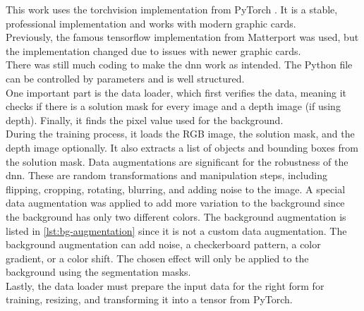 		This work uses the torchvision implementation from PyTorch \cite{Torchvision}. It is a stable, professional implementation and works with modern graphic cards.\\
		Previously, the famous tensorflow implementation from Matterport \cite{Matterport} was used, but the implementation changed due to issues with newer graphic cards.\\
		There was still much coding to make the \ac{dnn} work as intended. The Python file can be controlled by parameters and is well structured.\\
		One important part is the data loader, which first verifies the data, meaning it checks if there is a solution mask for every image and a depth image (if using depth). Finally, it finds the pixel value used for the background.\\
		During the training process, it loads the RGB image, the solution mask, and the depth image optionally. It also extracts a list of objects and bounding boxes from the solution mask. Data augmentations are significant for the robustness of the \ac{dnn}. These are random transformations and manipulation steps, including flipping, cropping, rotating, blurring, and adding noise to the image. A special data augmentation was applied to add more variation to the background since the background has only two different colors. The background augmentation is listed in \ref{lst:bg-augmentation} since it is not a custom data augmentation. The background augmentation can add noise, a checkerboard pattern, a color gradient, or a color shift. The chosen effect will only be applied to the background using the segmentation masks. \\
		Lastly, the data loader must prepare the input data for the right form for training, resizing, and transforming it into a tensor from PyTorch.
		
